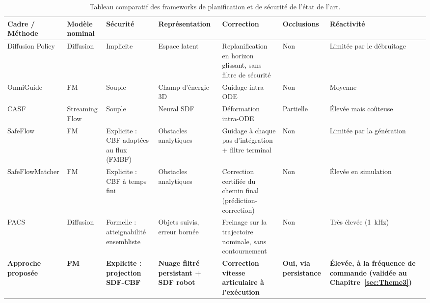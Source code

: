 \begin{table}[htbp!]
\centering
\caption{Tableau comparatif des frameworks de planification et de sécurité de l'état de l'art.}
\label{tab:etat_art}
\footnotesize
\setlength{\tabcolsep}{2pt}
\renewcommand{\arraystretch}{1.40}
\begin{tabular}{>{\raggedright\arraybackslash}p{2.1cm}>{\raggedright\arraybackslash}p{1.7cm}>{\raggedright\arraybackslash}p{2.1cm}>{\raggedright\arraybackslash}p{2.8cm}>{\raggedright\arraybackslash}p{2.8cm}>{\raggedright\arraybackslash}p{1.8cm}>{\raggedright\arraybackslash}p{2.2cm}}
\toprule
\textbf{Cadre / Méthode} & \textbf{Modèle nominal} & \textbf{Sécurité} & \textbf{Représentation} & \textbf{Correction} & \textbf{Occlusions} & \textbf{Réactivité} \\ \midrule
Diffusion Policy & Diffusion & Implicite & Espace latent & Replanification en horizon glissant, sans filtre de sécurité & Non & Limitée par le débruitage \\ \addlinespace[0.3em] \hline \addlinespace[0.3em]
OmniGuide & \acs{FM} & Souple & Champ d'énergie 3D & Guidage intra-\acs{ODE} & Non & Moyenne \\ \addlinespace[0.3em] \hline \addlinespace[0.3em]
CASF & Streaming Flow & Souple & Neural \acs{SDF} & Déformation intra-\acs{ODE} & Partielle & Élevée mais coûteuse \\ \addlinespace[0.3em] \hline \addlinespace[0.3em]
SafeFlow & \acs{FM} & Explicite : \acs{CBF} adaptées au flux (FMBF) & Obstacles analytiques & Guidage à chaque pas d'intégration + filtre terminal & Non & Limitée par la génération \\ \addlinespace[0.3em] \hline \addlinespace[0.3em]
SafeFlow\-Matcher & \acs{FM} & Explicite : \acs{CBF} à temps fini & Obstacles analytiques & Correction certifiée du chemin final (prédiction-correction) & Non & Élevée en simulation \\ \addlinespace[0.3em] \hline \addlinespace[0.3em]
\ac{PACS} & Diffusion & Formelle : atteignabilité ensembliste & Objets suivis, erreur bornée & Freinage sur la trajectoire nominale, sans contournement & Non & Très élevée (1~kHz) \\ \addlinespace[0.3em] \hline \addlinespace[0.3em]
\textbf{Approche proposée} & \textbf{\acs{FM}} & \textbf{Explicite : projection \acs{SDF}-\acs{CBF}} & \textbf{Nuage filtré persistant + \acs{SDF} robot} & \textbf{Correction vitesse articulaire à l'exécution} & \textbf{Oui, via persistance} & \textbf{Élevée, à la fréquence de commande (validée au Chapitre~\ref{sec:Theme3})} \\ \bottomrule
\end{tabular}
\end{table}

